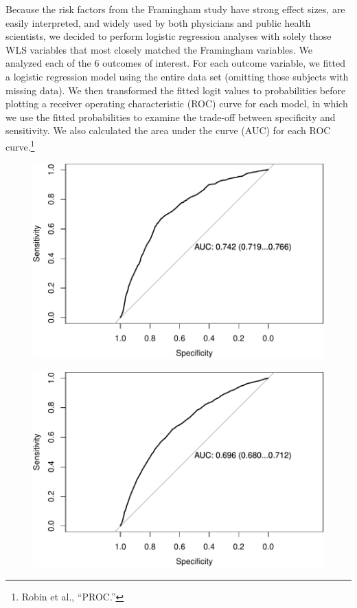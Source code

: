 \documentclass[11pt,]{article}
\let\rmarkdownfootnote\footnote%
\def\footnote{\protect\rmarkdownfootnote}
\begin{document}
Because the risk factors from the Framingham study have strong effect
sizes, are easily interpreted, and widely used by both physicians and
public health scientists, we decided to perform logistic regression
analyses with solely those WLS variables that most closely matched the
Framingham variables. We analyzed each of the 6 outcomes of interest.
For each outcome variable, we fitted a logistic regression model using
the entire data set (omitting those subjects with missing data). We then
transformed the fitted logit values to probabilities before plotting a
receiver operating characteristic (ROC) curve for each model, in which
we use the fitted probabilities to examine the trade-off between
specificity and sensitivity. We also calculated the area under the curve
(AUC) for each ROC curve.\footnote{Robin et al., ``PROC.'' }

\begin{figure}[htbp]
\centering
\includegraphics{report2_files/figure-latex/plot-hac2011-1.pdf}
\caption{}
\end{figure}

\begin{figure}[htbp]
\centering
\includegraphics{report2_files/figure-latex/plot-doc2011-1.pdf}
\caption{}
\end{figure}
\end{document}
